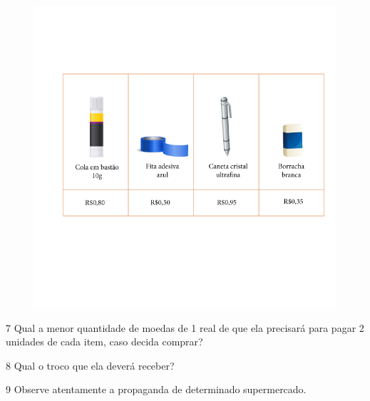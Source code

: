 \begin{figure}[htpb!]
\includegraphics[width=\textwidth]{../ilustracoes/MAT5/SAEB_5ANO_MAT_figura54.png}
\end{figure}

\num{7} 
  Qual a menor quantidade de moedas de 1 real de que ela precisará para
  pagar 2 unidades de cada item, caso decida comprar?


\num{8} Qual o troco que ela deverá receber?



\num{9} Observe atentamente a propaganda de determinado supermercado.

